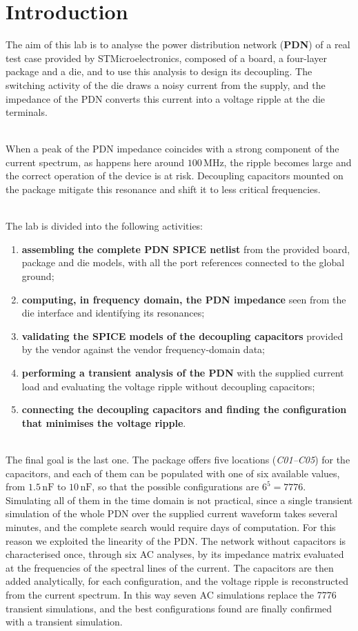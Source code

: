 \section*{Introduction}

The aim of this lab is to analyse the power distribution network (\textbf{PDN}) of a real test case provided by STMicroelectronics, composed of
a board, a four-layer package and a die, and to use this analysis to design its decoupling. The switching activity of the die draws a noisy
current from the supply, and the impedance of the PDN converts this current into a voltage ripple at the die terminals.

\noindent\\ When a peak of the PDN impedance coincides with a strong component of the current spectrum, as happens here around $100\,\text{MHz}$, the
ripple becomes large and the correct operation of the device is at risk. Decoupling capacitors mounted on the package mitigate this resonance and
shift it to less critical frequencies.

\noindent\\ The lab is divided into the following activities:
\begin{enumerate}
  \item \textbf{assembling the complete PDN SPICE netlist} from the provided board, package and die models, with all the port references connected
  to the global ground;
  \item \textbf{computing, in frequency domain, the PDN impedance} seen from the die interface and identifying its resonances;
  \item \textbf{validating the SPICE models of the decoupling capacitors} provided by the vendor against the vendor frequency-domain data;
  \item \textbf{performing a transient analysis of the PDN} with the supplied current load and evaluating the voltage ripple without decoupling capacitors;
  \item \textbf{connecting the decoupling capacitors and finding the configuration that minimises the voltage ripple}.
\end{enumerate}

\noindent\\ The final goal is the last one. The package offers five locations (\textit{C01--C05}) for the capacitors, and each of them can be populated
with one of six available values, from $1.5\,\text{nF}$ to $10\,\text{nF}$, so that the possible configurations are $6^5 = 7776$. Simulating all of
them in the time domain is not practical, since a single transient simulation of the whole PDN over the supplied current waveform takes several minutes,
and the complete search would require days of computation. For this reason we exploited the linearity of the PDN. The network without capacitors is
characterised once, through six AC analyses, by its impedance matrix evaluated at the frequencies of the spectral lines of the current. The capacitors
are then added analytically, for each configuration, and the voltage ripple is reconstructed from the current spectrum. In this way seven AC
simulations replace the 7776 transient simulations, and the best configurations found are finally confirmed with a transient simulation.

